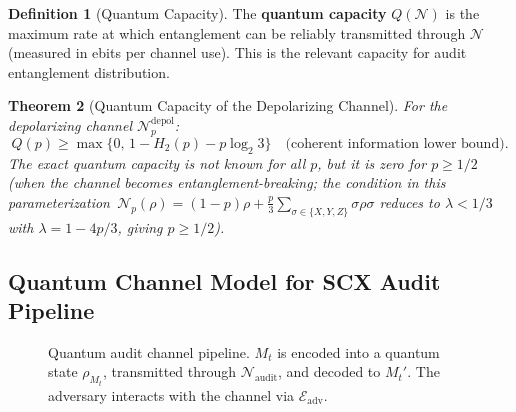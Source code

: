 \documentclass[11pt,a4paper]{article}
\theoremstyle{plain}
\newtheorem{theorem}{Theorem}[section]
\theoremstyle{definition}
\newtheorem{definition}[theorem]{Definition}
\theoremstyle{remark}
\newcommand{\cE}{\mathcal{E}}
\newcommand{\cN}{\mathcal{N}}
\newcommand{\Mt}{M_t}
\begin{document}
\begin{definition}[Quantum Capacity]
The \textbf{quantum capacity} $Q(\cN)$ is the maximum rate at which
entanglement can be reliably transmitted through $\cN$ (measured in
ebits per channel use). This is the relevant capacity for audit
entanglement distribution.
\end{definition}

\begin{theorem}[Quantum Capacity of the Depolarizing Channel]
For the depolarizing channel $\cN_p^{\text{depol}}$:
\[
Q(p) \geq \max\{0,\, 1 - H_2(p) - p\log_2 3\} \quad \text{(coherent information lower bound)}.
\]
The exact quantum capacity is not known for all $p$, but it is zero
for $p \geq 1/2$ (when the channel becomes entanglement-breaking;
the condition in this parameterization~$\cN_p(\rho) = (1-p)\rho + \frac{p}{3}\sum_{\sigma\in\{X,Y,Z\}}\sigma\rho\sigma$
reduces to $\lambda < 1/3$ with $\lambda = 1 - 4p/3$, giving $p \geq 1/2$).
\end{theorem}

\subsection{Quantum Channel Model for SCX Audit Pipeline}
\label{sec:channel_pipeline}

\begin{figure}[H]
\centering
{}
\caption{Quantum audit channel pipeline. $\Mt$ is encoded into a quantum state
$\rho_{\Mt}$, transmitted through $\cN_{\text{audit}}$, and decoded to
$\Mt'$. The adversary interacts with the channel via $\cE_{\text{adv}}$.}
\label{fig:channel_pipeline}
\end{figure}
\end{document}
